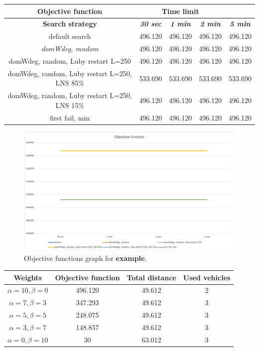 {
\renewcommand{\arraystretch}{2}
\begin{longtable}[h]{| c | c | c | c | c |}
    \hline
    \textbf{Objective function} & \multicolumn{3}{c}{Time limit} & \\
    \hline
    \textbf{Search strategy} & \textbf{\textit{30 sec}} & \textbf{\textit{1 min}} & \textbf{\textit{2 min}} & \textbf{\textit{5 min}} \\
    \hline
    \endhead
    default search                                & 496.120 & 496.120 & 496.120 & 496.120 \\
    \hline
    \textit{domWdeg, random}                      & 496.120 & 496.120 & 496.120 & 496.120 \\
    \hline
    domWdeg, random, Luby restart L=250           & 496.120 & 496.120 & 496.120 & 496.120 \\
    \hline
    domWdeg, random, Luby restart L=250, LNS 85\% & 533.690 & 533.690 & 533.690 & 533.690 \\
    \hline
    domWdeg, random, Luby restart L=250, LNS 15\% & 496.120 & 496.120 & 496.120 & 496.120 \\
    \hline
    first fail, min                               & 496.120 & 496.120 & 496.120 & 496.120 \\
    \hline
\end{longtable}
}

\begin{figure}[H]
    \centering
    \includegraphics[width=0.8\columnwidth]{../graphs/example-objf.png}
    \caption{Objective functions graph for \textbf{example}.}
\end{figure}

{
\renewcommand{\arraystretch}{2}
\begin{longtable}[h]{| c | c | c | c |}
    \hline
    \textbf{Weights} & \textbf{Objective function} & \textbf{Total distance} & \textbf{Used vehicles} \\
    \hline
    \endhead
    $\alpha = 10, \beta = 0$ & 496.120 & 49.612 & 2 \\
    \hline
    $\alpha = 7, \beta = 3$  & 347.293 & 49.612 & 3 \\
    \hline
    $\alpha = 5, \beta = 5$  & 248.075 & 49.612 & 3 \\
    \hline
    $\alpha = 3, \beta = 7$  & 148.857 & 49.612 & 3 \\
    \hline
    $\alpha = 0, \beta = 10$ &      30 & 63.012 & 3 \\
    \hline
\end{longtable}
}

